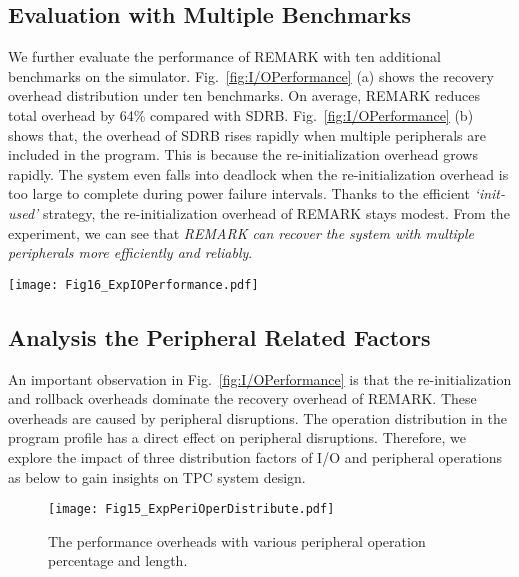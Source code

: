\subsection{Evaluation with Multiple Benchmarks} \label{sec:expEvaluation}
% 
We further evaluate the performance of REMARK with ten additional benchmarks on the simulator.
Fig.~\ref{fig:I/OPerformance} (a) shows the recovery overhead distribution under ten benchmarks.
On average, REMARK reduces total overhead by 64\% compared with SDRB.
Fig.~\ref{fig:I/OPerformance} (b) shows that, the overhead of SDRB rises rapidly when multiple peripherals are included in the program.
This is because the re-initialization overhead grows rapidly.
The system even falls into deadlock when the re-initialization overhead is too large to complete during power failure intervals.
Thanks to the efficient \emph{`init-used'} strategy, the re-initialization overhead of REMARK stays modest.
From the experiment, we can see that \emph{REMARK can recover the system with multiple peripherals more efficiently and reliably}.

%
\begin{figure*}[t]
    \centering
    \texttt{[image: Fig16\_ExpIOPerformance.pdf]}
    \caption{Recover overheads comparison between REMARK and SDRB.}
    \label{fig:I/OPerformance}
\end{figure*}

\subsection{Analysis the Peripheral Related Factors} \label{sec:expParaAnalysis}
%
An important observation in Fig.~\ref{fig:I/OPerformance} is that the re-initialization and rollback overheads dominate the recovery overhead of REMARK.
These overheads are caused by peripheral disruptions.
The operation distribution in the program profile has a direct effect on peripheral disruptions.
Therefore, we explore the impact of three distribution factors of I/O and peripheral operations as below to gain insights on TPC system design.

%
\begin{figure}[t]
    \centering
    \texttt{[image: Fig15\_ExpPeriOperDistribute.pdf]}
    \caption{{The performance overheads with various peripheral operation percentage and length.}}
    \label{fig:ExpPeriOperDistribute}
\end{figure}

